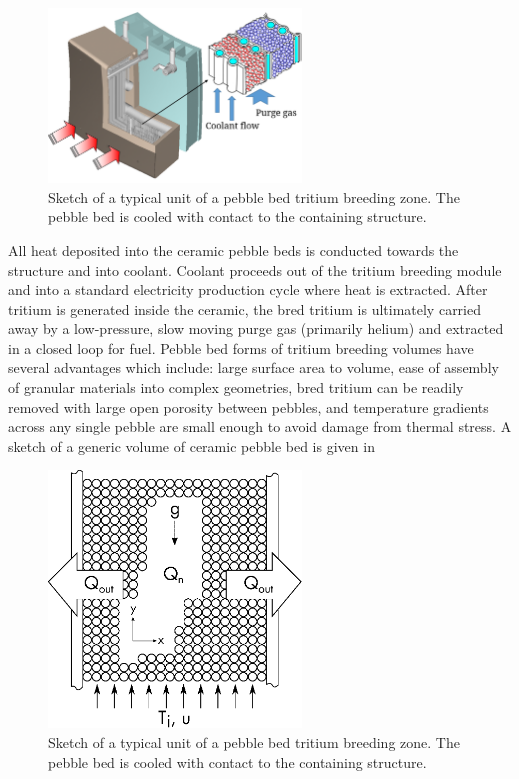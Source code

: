 \documentclass[11pt]{report} %
\begin{document}
\begin{figure}[ht]
	\centering
	\includegraphics[width=0.6\textwidth]{images/japanese-breeder-design} 
	\caption{Sketch of a typical unit of a pebble bed tritium breeding zone. The pebble bed is cooled with contact to the containing structure.}
	\label{fig:japanese-breeder-design}
\end{figure}

All heat deposited into the ceramic pebble beds is conducted towards the structure and into coolant. Coolant proceeds out of the tritium breeding module and into a standard electricity production cycle where heat is extracted. After tritium is generated inside the ceramic, the bred tritium is ultimately carried away by a low-pressure, slow moving purge gas (primarily helium) and extracted in a closed loop for fuel. Pebble bed forms of tritium breeding volumes have several advantages which include: large surface area to volume, ease of assembly of granular materials into complex geometries, bred tritium can be readily removed with large open porosity between pebbles, and temperature gradients across any single pebble are small enough to avoid damage from thermal stress. A sketch of a generic volume of ceramic pebble bed is given in 

\begin{figure}[ht]
	\centering
	\includegraphics[width=0.6\textwidth]{images/x-domain} 
	\caption{Sketch of a typical unit of a pebble bed tritium breeding zone. The pebble bed is cooled with contact to the containing structure.}
	\label{fig:solid-breeder-sketch}
\end{figure}
\end{document}
